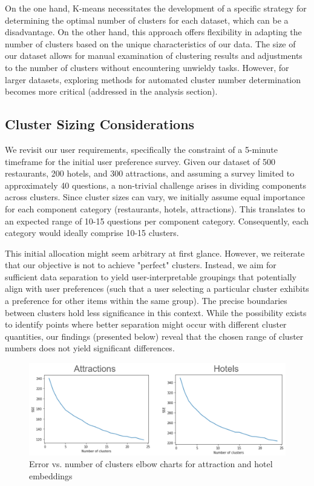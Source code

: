 \documentclass[12pt,a4paper]{report}
\begin{document}
On the one hand, K-means necessitates the development of a specific strategy for determining the optimal number of clusters for each dataset, which can be a disadvantage.  On the other hand, this approach offers flexibility in adapting the number of clusters based on the unique characteristics of our data.  The size of our dataset allows for manual examination of clustering results and adjustments to the number of clusters without encountering unwieldy tasks.  However, for larger datasets, exploring methods for automated cluster number determination becomes more critical (addressed in the analysis section).

\subsection{Cluster Sizing Considerations}

We revisit our user requirements, specifically the constraint of a 5-minute timeframe for the initial user preference survey.  Given our dataset of 500 restaurants, 200 hotels, and 300 attractions, and assuming a survey limited to approximately 40 questions, a non-trivial challenge arises in dividing components across clusters.  Since cluster sizes can vary, we initially assume equal importance for each component category (restaurants, hotels, attractions).  This translates to an expected range of 10-15 questions per component category. Consequently, each category would ideally comprise 10-15 clusters.

This initial allocation might seem arbitrary at first glance. However, we reiterate that our objective is not to achieve "perfect" clusters.  Instead, we aim for sufficient data separation to yield user-interpretable groupings that potentially align with user preferences (such that a user selecting a particular cluster exhibits a preference for other items within the same group).  The precise boundaries between clusters hold less significance in this context.  While the possibility exists to identify points where better separation might occur with different cluster quantities, our findings (presented below) reveal that the chosen range of cluster numbers does not yield significant differences.


\begin{figure}[H]
    \centering
    \includegraphics[scale=.8]{elbowcharts1}
    \caption{Error vs. number of clusters elbow charts for attraction and hotel embeddings}
\end{figure}
\end{document}
